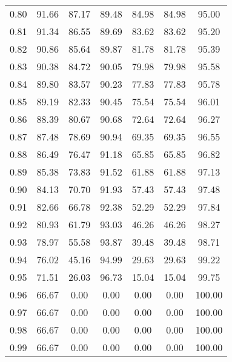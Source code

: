 \begin{tabular}{|c|c|c|c|c|c|c|}
      0.80 &     91.66 &     87.17 &      89.48 &   84.98 &      84.98 &         95.00 \\
      0.81 &     91.34 &     86.55 &      89.69 &   83.62 &      83.62 &         95.20 \\
      0.82 &     90.86 &     85.64 &      89.87 &   81.78 &      81.78 &         95.39 \\
      0.83 &     90.38 &     84.72 &      90.05 &   79.98 &      79.98 &         95.58 \\
      0.84 &     89.80 &     83.57 &      90.23 &   77.83 &      77.83 &         95.78 \\
      0.85 &     89.19 &     82.33 &      90.45 &   75.54 &      75.54 &         96.01 \\
      0.86 &     88.39 &     80.67 &      90.68 &   72.64 &      72.64 &         96.27 \\
      0.87 &     87.48 &     78.69 &      90.94 &   69.35 &      69.35 &         96.55 \\
      0.88 &     86.49 &     76.47 &      91.18 &   65.85 &      65.85 &         96.82 \\
      0.89 &     85.38 &     73.83 &      91.52 &   61.88 &      61.88 &         97.13 \\
      0.90 &     84.13 &     70.70 &      91.93 &   57.43 &      57.43 &         97.48 \\
      0.91 &     82.66 &     66.78 &      92.38 &   52.29 &      52.29 &         97.84 \\
      0.92 &     80.93 &     61.79 &      93.03 &   46.26 &      46.26 &         98.27 \\
      0.93 &     78.97 &     55.58 &      93.87 &   39.48 &      39.48 &         98.71 \\
      0.94 &     76.02 &     45.16 &      94.99 &   29.63 &      29.63 &         99.22 \\
      0.95 &     71.51 &     26.03 &      96.73 &   15.04 &      15.04 &         99.75 \\
      0.96 &     66.67 &      0.00 &       0.00 &    0.00 &       0.00 &        100.00 \\
      0.97 &     66.67 &      0.00 &       0.00 &    0.00 &       0.00 &        100.00 \\
      0.98 &     66.67 &      0.00 &       0.00 &    0.00 &       0.00 &        100.00 \\
      0.99 &     66.67 &      0.00 &       0.00 &    0.00 &       0.00 &        100.00 \\
\bottomrule
\end{tabular}
